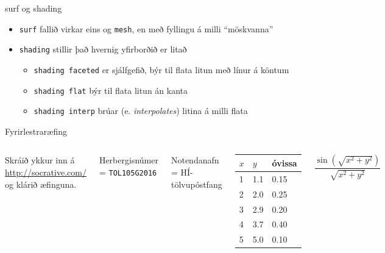 \documentclass{beamer}
\begin{document}
\begin{frame}{surf og shading}
\begin{itemize}
 \item \texttt{surf} fallið virkar eins og \texttt{mesh}, en með fyllingu á milli ``möskvanna''
 \item \texttt{shading} stillir það hvernig yfirborðið er litað
 \begin{itemize}
  \item \texttt{shading faceted} er sjálfgefið, býr til flata litun með línur á köntum
  \item \texttt{shading flat} býr til flata litun án kanta
  \item \texttt{shading interp} brúar (e. \emph{interpolates}) litina á milli flata
 \end{itemize}
\end{itemize}
\end{frame}

\begin{frame}{Fyrirlestraræfing}
\begin{columns}
Skráið ykkur inn á \url{http://socrative.com/} og klárið æfinguna.

Herbergisnúmer = \texttt{TOL105G2016}

Notendanafn = HÍ-tölvupóstfang
\begin{center}
\begin{tabular}{lll}
\toprule
$x$&$y$&óvissa\\
\midrule
1&1.1&0.15\\
2&2.0&0.25\\
3&2.9&0.20\\
4&3.7&0.40\\
5&5.0&0.10\\
\bottomrule
\end{tabular}
\end{center}
\[
 \frac{\sin(\sqrt{x^2 + y^2})}{\sqrt{x^2 + y^2}}
\]
\end{columns}
\end{frame}
\end{document}
